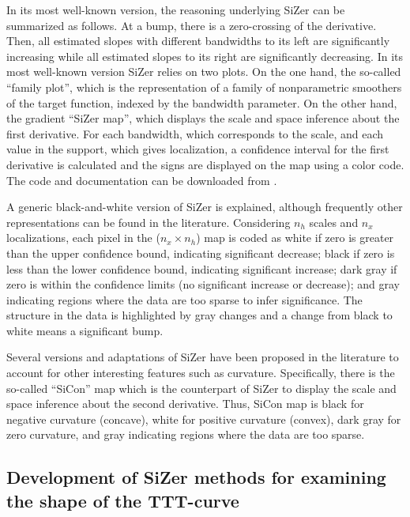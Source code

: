 \documentclass[preprint,12pt]{elsarticle}
\begin{document}
In its most well-known version, the reasoning underlying SiZer can be summarized as follows. At a bump, there is a zero-crossing of the derivative. Then, all estimated slopes with different bandwidths to its left are significantly increasing while all estimated slopes to its right are significantly decreasing. In its most well-known version SiZer relies on two plots. On the one hand, the so-called ``family plot'', which is the representation of a family of nonparametric smoothers of the target function, indexed by the bandwidth parameter. On the other hand, the gradient ``SiZer map'', which displays the scale and space inference about the first derivative. For each bandwidth, which corresponds to the scale,  and each value in the support, which gives localization, a confidence interval for the first derivative is calculated and the signs are displayed on the map using a color code. The code and documentation can be downloaded from \cite{Marron2020}.%

A generic black-and-white version of SiZer is explained, although frequently other representations can be found in the literature.
Considering $n_h$ scales and $n_x$ localizations, each pixel in the ($n_x \times n_h$) map is coded as white if zero is greater than the upper confidence bound, indicating significant decrease;  black  if zero is less than the lower confidence bound, indicating significant increase; dark gray  if zero is within the confidence limits (no significant increase or decrease); and gray indicating regions where the data are too sparse to infer significance. 
The structure in the data is highlighted by gray changes and a change from black to white  means a significant bump. 

Several versions and adaptations of SiZer have been proposed in the literature to account for other interesting features such as curvature. Specifically, there is the so-called  ``SiCon'' map which is the counterpart of SiZer to display the scale and space inference about the second derivative. Thus, SiCon map is black for negative curvature (concave), white for positive curvature (convex), dark gray for zero curvature, and gray indicating regions where the data are too sparse. 


\subsection{Development of SiZer methods for examining the shape of the TTT-curve}
 
\end{document}

